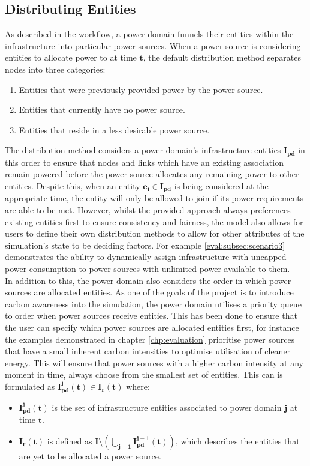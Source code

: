 \documentclass{l4proj}
\begin{document}
\subsection{Distributing Entities}\label{subsec:distributing-entities}
As described in the workflow, a power domain funnels their entities within the infrastructure into particular power sources.
When a power source is considering entities to allocate power to at time $\mathbf{t}$, the default distribution method separates nodes into three categories:
\begin{enumerate}
    \item Entities that were previously provided power by the power source.
    \item Entities that currently have no power source.
    \item Entities that reside in a less desirable power source.
\end{enumerate}

The distribution method considers a power domain's infrastructure entities $\mathbf{I_{pd}}$ in this order to ensure that nodes and links which have an existing association remain powered before the power source allocates any remaining power to other entities.
Despite this, when an entity $\mathbf{e_{i} \in I_{pd}}$ is being considered at the appropriate time, the entity will only be allowed to join if its power requirements are able to be met.
However, whilst the provided approach always preferences existing entities first to ensure consistency and fairness, the model also allows for users to define their own distribution methods to allow for other attributes of the simulation's state to be deciding factors.
For example \ref{eval:subsec:scenario3} demonstrates the ability to dynamically assign infrastructure with uncapped power consumption to power sources with unlimited power available to them.\\

In addition to this, the power domain also considers the order in which power sources are allocated entities.
As one of the goals of the project is to introduce carbon awareness into the simulation, the power domain utilises a priority queue to order when power sources receive entities.
This has been done to ensure that the user can specify which power sources are allocated entities first, for instance the examples demonstrated in chapter \ref{chp:evaluation} prioritise power sources that have a small inherent carbon intensities to optimise utilisation of cleaner energy.
This will ensure that power sources with a higher carbon intensity at any moment in time, always choose from the smallest set of entities.
This can is formulated as $\mathbf{I_{pd}^j(t) \in I_{r}(t)}$ where:
\begin{itemize}
    \item $\mathbf{I_{pd}^j(t)}$ is the set of infrastructure entities associated to power domain $\mathbf{j}$ at time $\mathbf{t}$.\\
    \item $\mathbf{I_{r}(t)}$ is defined as $\mathbf{I \setminus \left( \bigcup_{j-1} I_{pd}^{j-1}(t) \right)}$, which describes the entities that are yet to be allocated a power source.
\end{itemize}
\end{document}
